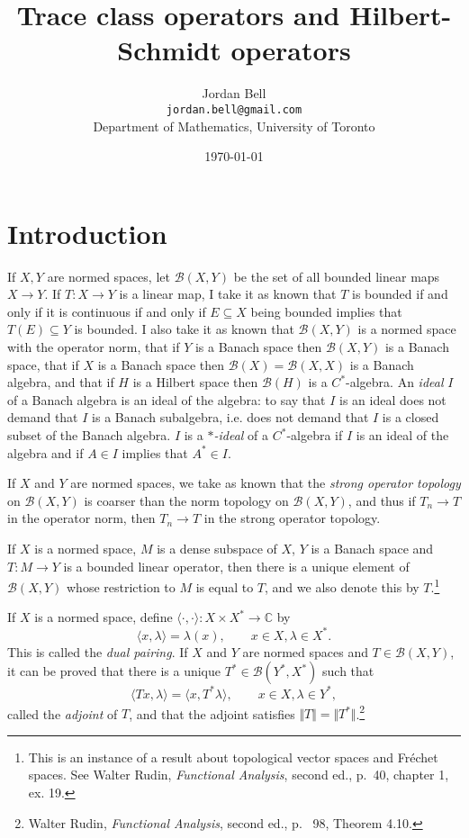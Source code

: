 \documentclass{article}
\newcommand{\inner}[2]{\langle #1, #2 \rangle}
\newcommand{\norm}[1]{\Vert #1 \Vert}
\begin{document}
\title{Trace class operators and Hilbert-Schmidt operators}
\author{Jordan Bell\\ \texttt{jordan.bell@gmail.com}\\Department of Mathematics, University of Toronto}
\date{\today}

\maketitle

\section{Introduction}
If $X,Y$ are normed spaces, let $\mathscr{B}(X,Y)$ be the set of all bounded linear maps $X \to Y$. If $T:X \to Y$ is a linear map,
I take it as known that $T$ is bounded if and only if it is continuous if and only if $E \subseteq X$ being bounded implies that $T(E) \subseteq Y$ is bounded.
I also take it as known that $\mathscr{B}(X,Y)$ is a normed space with the operator norm,
 that if $Y$ is a Banach space then $\mathscr{B}(X,Y)$ is a Banach space,  that if $X$ is a Banach space then $\mathscr{B}(X)=\mathscr{B}(X,X)$ is a Banach algebra, and that if $H$ is a Hilbert space then $\mathscr{B}(H)$ is a 
 $C^*$-algebra. An {\em ideal} $I$ of a Banach algebra is an ideal of the algebra: to say that $I$ is an ideal does not demand that $I$ is  a Banach subalgebra, i.e. does not demand
 that $I$ is a closed subset of the Banach algebra. $I$ is a  {\em $*$-ideal} of a $C^*$-algebra if $I$ is an ideal of the algebra and if $A \in I$ implies that $A^* \in I$.

If $X$ and $Y$ are normed spaces, we take as known that the {\em strong operator topology} on $\mathscr{B}(X,Y)$ is coarser than the norm topology on $\mathscr{B}(X,Y)$, and thus if $T_n \to T$
in the operator norm, then $T_n \to T$ in the strong operator topology.

If $X$ is a normed space, $M$ is a dense subspace of $X$, $Y$ is a Banach space and $T:M \to Y$ is a bounded linear operator, then there is a unique element of $\mathscr{B}(X,Y)$
whose restriction to $M$ is equal to $T$, and we also denote this  by $T$.\footnote{This is an instance of a result about topological vector spaces and
Fr\'echet spaces. See Walter Rudin, {\em Functional Analysis}, second ed., p.~40, chapter 1, ex. 19.} 

If $X$ is a normed space, define $\inner{\cdot}{\cdot}:X \times X^* \to \mathbb{C}$ by 
\[
\inner{x}{\lambda}=\lambda(x), \qquad x \in X, \lambda \in X^*.
\]
This is called the {\em dual pairing}. If $X$ and $Y$ are normed spaces and $T \in \mathscr{B}(X,Y)$, it can be proved that there is a unique $T^* \in \mathscr{B}(Y^*,X^*)$ such that
\[
\inner{Tx}{\lambda}=\inner{x}{T^*\lambda}, \qquad x \in X, \lambda \in Y^*,
\]
called the {\em adjoint} of $T$, and that the adjoint satisfies $\norm{T}=\norm{T^*}$.\footnote{Walter Rudin,
{\em Functional Analysis}, second ed., p.~ 98, Theorem 4.10.}
\end{document}
